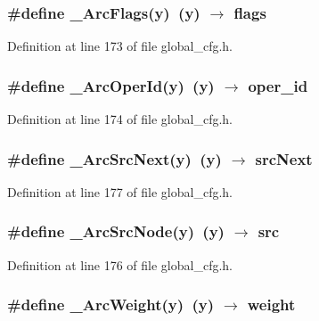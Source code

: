 \subsubsection{\setlength{\rightskip}{0pt plus 5cm}\#define \_\-Arc\-Flags(y)~(y) $\rightarrow$ flags}\label{global__cfg_8h_005abc58c6bd546ff12289389e90eba4}




Definition at line 173 of file global\_\-cfg.h.
\subsubsection{\setlength{\rightskip}{0pt plus 5cm}\#define \_\-Arc\-Oper\-Id(y)~(y) $\rightarrow$ oper\_\-id}\label{global__cfg_8h_9da90637204f762034373f3b241250b7}




Definition at line 174 of file global\_\-cfg.h.
\subsubsection{\setlength{\rightskip}{0pt plus 5cm}\#define \_\-Arc\-Src\-Next(y)~(y) $\rightarrow$ src\-Next}\label{global__cfg_8h_d23f8e711d2c4207251d33d0d47751af}




Definition at line 177 of file global\_\-cfg.h.
\subsubsection{\setlength{\rightskip}{0pt plus 5cm}\#define \_\-Arc\-Src\-Node(y)~(y) $\rightarrow$ src}\label{global__cfg_8h_96e1816326241d53323a1d0a47be7aa8}




Definition at line 176 of file global\_\-cfg.h.
\subsubsection{\setlength{\rightskip}{0pt plus 5cm}\#define \_\-Arc\-Weight(y)~(y) $\rightarrow$ weight}\label{global__cfg_8h_275938deba62f18aaa9f4ef87554648c}




